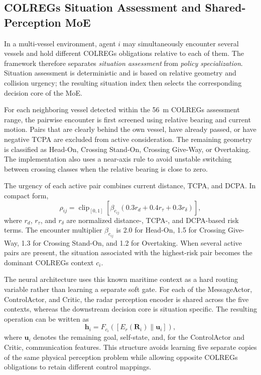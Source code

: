 \documentclass[final,5p,times,twocolumn]{elsarticle}
\begin{document}
\subsection{COLREGs Situation Assessment and Shared-Perception MoE}
\label{sec:colregs_routing}
\label{sec:shared_moe}
{\color{violet}
In a multi-vessel environment, agent $i$ may simultaneously encounter several vessels and hold different COLREGs obligations relative to each of them. The framework therefore separates \emph{situation assessment} from \emph{policy specialization}. Situation assessment is deterministic and is based on relative geometry and collision urgency; the resulting situation index then selects the corresponding decision core of the MoE.

For each neighboring vessel detected within the 56~m COLREGs assessment range, the pairwise encounter is first screened using relative bearing and current motion. Pairs that are clearly behind the own vessel, have already passed, or have negative TCPA are excluded from active consideration. The remaining geometry is classified as Head-On, Crossing Stand-On, Crossing Give-Way, or Overtaking. The implementation also uses a near-axis rule to avoid unstable switching between crossing classes when the relative bearing is close to zero.

The urgency of each active pair combines current distance, TCPA, and DCPA. In compact form,
\begin{equation}
\rho_{ij}=\operatorname{clip}_{[0,1]}
\left[\beta_{c_{ij}}(0.3r_d+0.4r_{\tau}+0.3r_{\delta})\right],
\label{eq:risk}
\end{equation}
where $r_d$, $r_{\tau}$, and $r_{\delta}$ are normalized distance-, TCPA-, and DCPA-based risk terms. The encounter multiplier $\beta_{c_{ij}}$ is 2.0 for Head-On, 1.5 for Crossing Give-Way, 1.3 for Crossing Stand-On, and 1.2 for Overtaking. When several active pairs are present, the situation associated with the highest-risk pair becomes the dominant COLREGs context $c_i$.

The neural architecture uses this known maritime context as a hard routing variable rather than learning a separate soft gate. For each of the MessageActor, ControlActor, and Critic, the radar perception encoder is shared across the five contexts, whereas the downstream decision core is situation specific. The resulting operation can be written as
\begin{equation}
\mathbf{h}_i=F_{c_i}([E_r(\mathbf{R}_i)\|\mathbf{u}_i]),
\label{eq:shared_moe}
\end{equation}
where $\mathbf{u}_i$ denotes the remaining goal, self-state, and, for the ControlActor and Critic, communication features. This structure avoids learning five separate copies of the same physical perception problem while allowing opposite COLREGs obligations to retain different control mappings.

}
\end{document}
